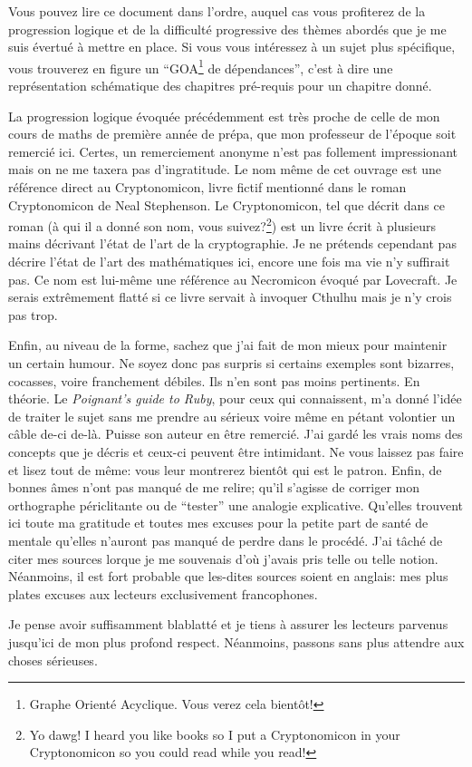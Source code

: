 Vous pouvez lire ce document dans l'ordre, auquel cas vous profiterez
de la progression logique et de la difficulté progressive des thèmes
abordés que je me suis évertué à mettre en place. Si vous vous
intéressez à un sujet plus spécifique, vous trouverez en figure
un ``GOA\footnote{Graphe Orienté
  Acyclique. Vous verez cela bientôt!} de dépendances'', c'est à dire
une représentation schématique des chapitres pré-requis pour un
chapitre donné. 


La progression logique évoquée précédemment est très proche de celle
de mon cours de maths de première année de prépa, que mon professeur
de l'époque soit remercié ici. Certes, un remerciement anonyme n'est
pas follement impressionant mais on ne me taxera pas d'ingratitude. Le
nom même de cet ouvrage est une référence direct au Cryptonomicon,
livre fictif mentionné dans le roman Cryptonomicon de Neal
Stephenson. Le Cryptonomicon, tel que décrit dans ce roman (à qui il a
donné son nom, vous suivez?\footnote{Yo dawg! I heard you like books
  so I put a Cryptonomicon in your Cryptonomicon so you could read
  while you read!}) est un livre écrit à plusieurs mains décrivant
l'état de l'art de la cryptographie. Je ne prétends cependant pas
décrire l'état de l'art des mathématiques ici, encore une fois ma vie
n'y suffirait pas. Ce nom est lui-même une référence au Necromicon
évoqué par Lovecraft. Je serais extrêmement flatté si ce livre servait
à invoquer Cthulhu mais je n'y crois pas trop.

Enfin, au niveau de la forme, sachez que j'ai fait de mon mieux pour
maintenir un certain humour. Ne soyez donc pas surpris si certains
exemples sont bizarres, cocasses, voire franchement débiles. Ils n'en
sont pas moins pertinents. En théorie. Le \emph{Poignant's guide to
Ruby}, pour ceux qui connaissent, m'a donné l'idée de traiter le sujet
sans me prendre au sérieux voire même en pétant volontier un câble
de-ci de-là. Puisse son auteur en être remercié. J'ai gardé les vrais
noms des concepts que je décris et ceux-ci peuvent être intimidant. Ne
vous laissez pas faire et lisez tout de même: vous leur montrerez
bientôt qui est le patron. Enfin, de bonnes âmes n'ont pas manqué de
me relire; qu'il s'agisse de corriger mon orthographe périclitante ou
de ``tester'' une analogie explicative. Qu'elles trouvent ici toute ma
gratitude et toutes mes excuses pour la petite part de santé de
mentale qu'elles n'auront pas manqué de perdre dans le procédé. J'ai
tâché de citer mes sources lorque je me souvenais d'où j'avais pris
telle ou telle notion. Néanmoins, il est fort probable que les-dites
sources soient en anglais: mes plus plates excuses aux lecteurs
exclusivement francophones.

Je pense avoir suffisamment blablatté et je tiens à assurer les
lecteurs parvenus jusqu'ici de mon plus profond respect. Néanmoins,
passons sans plus attendre aux choses sérieuses.
